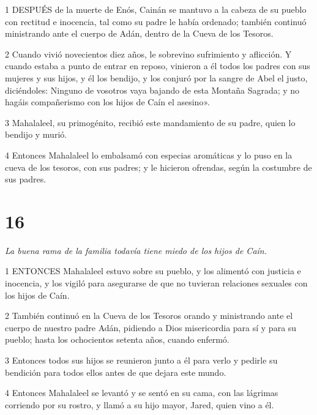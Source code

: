 \par 1 DESPUÉS de la muerte de Enós, Cainán se mantuvo a la cabeza de su pueblo con rectitud e inocencia, tal como su padre le había ordenado; también continuó ministrando ante el cuerpo de Adán, dentro de la Cueva de los Tesoros.

\par 2 Cuando vivió novecientos diez años, le sobrevino sufrimiento y aflicción. Y cuando estaba a punto de entrar en reposo, vinieron a él todos los padres con sus mujeres y sus hijos, y él los bendijo, y los conjuró por la sangre de Abel el justo, diciéndoles: Ninguno de vosotros vaya bajando de esta Montaña Sagrada; y no hagáis compañerismo con los hijos de Caín el asesino».

\par 3 Mahalaleel, su primogénito, recibió este mandamiento de su padre, quien lo bendijo y murió.

\par 4 Entonces Mahalaleel lo embalsamó con especias aromáticas y lo puso en la cueva de los tesoros, con sus padres; y le hicieron ofrendas, según la costumbre de sus padres.



\chapter{16}

\par \textit{La buena rama de la familia todavía tiene miedo de los hijos de Caín.}

\par 1 ENTONCES Mahalaleel estuvo sobre su pueblo, y los alimentó con justicia e inocencia, y los vigiló para asegurarse de que no tuvieran relaciones sexuales con los hijos de Caín.

\par 2 También continuó en la Cueva de los Tesoros orando y ministrando ante el cuerpo de nuestro padre Adán, pidiendo a Dios misericordia para sí y para su pueblo; hasta los ochocientos setenta años, cuando enfermó.

\par 3 Entonces todos sus hijos se reunieron junto a él para verlo y pedirle su bendición para todos ellos antes de que dejara este mundo.

\par 4 Entonces Mahalaleel se levantó y se sentó en su cama, con las lágrimas corriendo por su rostro, y llamó a su hijo mayor, Jared, quien vino a él.

